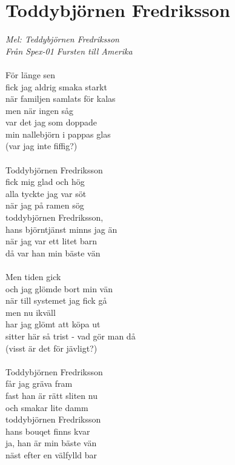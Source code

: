 \documentclass[a5paper,15pt]{article}
\begin{document}
\section{Toddybjörnen Fredriksson}
\emph{Mel: Teddybjörnen Fredriksson \\ Från Spex-01 Fursten till Amerika} \\
\\
För länge sen\\
fick jag aldrig smaka starkt\\
när familjen samlats för kalas\\
men när ingen såg\\
var det jag som doppade\\
min nallebjörn i pappas glas\\
(var jag inte fiffig?)\\
\\
Toddybjörnen Fredriksson\\
fick mig glad och hög\\
alla tyckte jag var söt\\
när jag på ramen sög\\
toddybjörnen Fredriksson,\\
hans björntjänst minns jag än\\
när jag var ett litet barn\\
då var han min bäste vän\\
\\
Men tiden gick\\
och jag glömde bort min vän\\
när till systemet jag fick gå\\
men nu ikväll\\
har jag glömt att köpa ut\\
sitter här så trist - vad gör man då\\
(visst är det för jävligt?)\\
\\
Toddybjörnen Fredriksson\\
får jag gräva fram\\
fast han är rätt sliten nu\\
och smakar lite damm\\
toddybjörnen Fredriksson\\
hans bouqet finns kvar\\
ja, han är min bäste vän\\
näst efter en välfylld bar\\
\\
\end{document}
